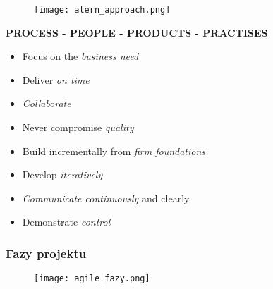 \documentclass[a4paper]{article}
\begin{document}
    \begin{figure}[H]
        \texttt{[image: atern\_approach.png]}
    \end{figure}

    \textbf{PROCESS - PEOPLE - PRODUCTS - PRACTISES}
    \begin{itemize}
        \item Focus on the \textit{business need}
        \item Deliver \textit{on time}
        \item \textit{Collaborate}
        \item Never compromise \textit{quality}
        \item Build incrementally from \textit{firm foundations}
        \item Develop \textit{iteratively}
        \item \textit{Communicate continuously} and clearly
        \item Demonstrate \textit{control}
    \end{itemize}



    \subsubsection{Fazy projektu}
    \begin{figure}[H]
        \texttt{[image: agile\_fazy.png]}
    \end{figure}
\end{document}
